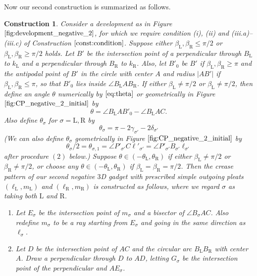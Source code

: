 \documentclass[11pt]{amsart}
\newtheorem{construction}[theorem]{Construction}
\numberwithin{equation}{section}
\numberwithin{theorem}{section}
\newcommand{\Lt}{\ensuremath{\mathrm{L}}}
\newcommand{\Rt}{\ensuremath{\mathrm{R}}}
\newcommand{\norm}[1]{\ensuremath{\left| #1 \right|}}
\begin{document}
Now our second construction is summarized as follows.
\begin{construction}\label{const:negative_2}\rm
Consider a development as in Figure $\ref{fig:development_negative_2}$, 
for which we require condition (i), (ii) and (iii.a)--(iii.c) of Construction $\ref{const:condition}$.
Suppose either $\beta_\Lt ,\beta_\Rt\leqslant\pi /2$ or $\beta_\Lt ,\beta_\Rt\geqslant\pi /2$ holds.
Let $B'$ be the intersection point of a perpendicular through $B_\Lt$ to $k_\Lt$ and a perpendicular through $B_\Rt$ to $k_\Rt$.
Also, let $B'_0$ be $B'$ if $\beta_\Lt ,\beta_\Rt\geqslant\pi$
and the antipodal point of $B'$ in the circle with center $A$ and radius $\norm{AB'}$ if $\beta_\Lt ,\beta_\Rt\leqslant\pi$,
so that $B'_0$ lies inside $\angle B_\Lt AB_\Rt$.
If either $\beta_\Lt\neq\pi /2$ or $\beta_\Lt\neq\pi /2$, 
then define an angle $\theta$ numerically by $\eqref{eq:theta}$ or geometrically in Figure $\ref{fig:CP_negative_2_initial}$ by
\begin{equation*}
\theta =\angle B_\Lt AB'_0-\angle B_\Lt AC.
\end{equation*}
Also define $\theta_\sigma$ for $\sigma =\Lt ,\Rt$ by
\begin{equation*}
\theta_\sigma =\pi -2\gamma_{\sigma'}-2\delta_{\sigma'}
\end{equation*}
(We can also define $\theta_\sigma$ geometrically in Figure $\ref{fig:CP_negative_2_initial}$ by
\begin{equation*}
\theta_\sigma /2=\theta_{\sigma ,1}=\angle P'_{\sigma'}C\ell'_{\sigma'}=\angle P'_{\sigma'}B_{\sigma'}\ell_{\sigma'}
\end{equation*}
after procedure $(2)$ below.)
Suppose $\theta\in (-\theta_\Lt ,\theta_\Rt )$ if either $\beta_\Lt\neq\pi /2$ or $\beta_\Rt\ne	\pi /2$,
or choose any $\theta\in (-\theta_\Lt ,\theta_\Rt )$ if $\beta_\Lt =\beta_\Rt =\pi /2$.
Then the crease pattern of our second negative $3$D gadget with prescribed simple outgoing pleats $(\ell_\Lt ,m_\Lt )$ and $(\ell_\Rt ,m_\Rt )$
is constructed as follows, where we regard $\sigma$ as taking both $\Lt$ and $\Rt$.
\begin{enumerate}[(1)]
\item Let $E_\sigma$ be the intersection point of $m_\sigma$ and a bisector of $\angle B_\sigma AC$.
Also redefine $m_\sigma$ to be a ray starting from $E_\sigma$ and going in the same direction as $\ell_\sigma$.
\item Let $D$ be the intersection point of $AC$ and the circular arc $B_\Lt B_\Rt$ with center $A$.
Draw a perpendicular through $D$ to $AD$, letting $G_\sigma$ be the intersection point of the perpendicular and $AE_\sigma$.

\end{enumerate}
\end{construction}
\end{document}

